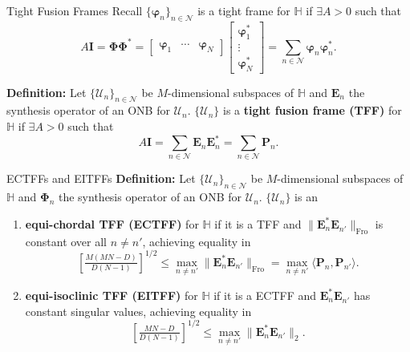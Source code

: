 \documentclass[12pt]{beamer}
\newcommand{\bbH}{\mathbb{H}}
\newcommand{\bfE}{\mathbf{E}}
\newcommand{\bfI}{\mathbf{I}}
\newcommand{\bfP}{\mathbf{P}}
\newcommand{\bfphi}{\boldsymbol{\varphi}}
\newcommand{\bfPhi}{\boldsymbol{\Phi}}
\newcommand{\calN}{\mathcal{N}}
\newcommand{\calU}{\mathcal{U}}
\newcommand{\Fro}{\operatorname{Fro}}
\newcommand{\norm}[1]{\|{#1}\|}
\newcommand{\ip}[2]{\langle{#1},{#2}\rangle}
\begin{document}
\begin{frame}{Tight Fusion Frames}
Recall $\{\bfphi_n\}_{n\in\calN}$ is a tight frame for $\bbH$ if $\exists A>0$ such that 
\begin{equation*}
    A\bfI
    =\bfPhi\bfPhi^*
    =\left[\begin{array}{ccc}
    \bfphi_1 & \cdots & \bfphi_N  
    \end{array}\right]
    \left[\begin{array}{c}
    \bfphi_1^*\\
    \vdots\\
    \bfphi_N^*
    \end{array}\right]
    =\sum_{n\in\calN}\bfphi_n^{}\bfphi_n^*.
\end{equation*}

\vfill

\textbf{Definition:} Let $\{\calU_n\}_{n\in\calN}$ be $M$-dimensional subspaces of $\bbH$ and $\bfE_n$ the synthesis operator of an ONB for $\calU_n$. $\{\calU_n\}$ is a \textbf{tight fusion frame (TFF)} for $\bbH$ if $\exists A>0$ such that 
\begin{equation*}
    A\bfI=\sum_{n\in\calN}\bfE_n^{}\bfE_n^*=\sum_{n\in\calN}\bfP_n.
\end{equation*}

\end{frame}

\begin{frame}{ECTFFs and EITFFs}
\textbf{Definition:} Let $\{\calU_n\}_{n\in\calN}$ be $M$-dimensional subspaces of $\bbH$ and $\bfPhi_n$ the synthesis operator of an ONB for $\calU_n$. $\{\calU_n\}$ is an

\begin{enumerate}
    \item \textbf{equi-chordal TFF (ECTFF)} for $\bbH$ if it is a TFF and $\norm{\bfE_n^*\bfE_{n'}^{}}_{\Fro}$ is constant over all $n\not=n'$, achieving equality in
    \begin{equation*}
        \left[\tfrac{M(MN-D)}{D(N-1)}\right]^{1/2}\leq\max_{n\not=n'}\norm{\bfE_n^*\bfE_{n'}^{}}_{\Fro}=\max_{n\not=n'}\ip{\bfP_n}{\bfP_{n'}}.
    \end{equation*}
    \item \textbf{equi-isoclinic TFF (EITFF)} for $\bbH$ if it is a ECTFF and $\bfE_n^*\bfE_{n'}^{}$ has constant singular values, achieving equality in
    \begin{equation*}
        \left[\tfrac{MN-D}{D(N-1)}\right]^{1/2}\leq\max_{n\not=n'}\norm{\bfE_n^*\bfE_{n'}^{}}_2.
    \end{equation*}
\end{enumerate}

\end{frame}
\end{document}
